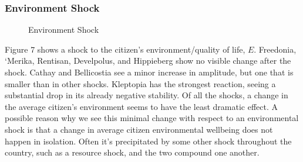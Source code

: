 \documentclass[12pt]{article}
\begin{document}
\begin{spacing}{1.5}
\subsubsection{Environment Shock}

\begin{figure}
\centering
{} 
\caption{Environment Shock}

\end{figure}


Figure 7 shows a shock to the citizen's environment/quality of life, $E$. Freedonia, `Merika, Rentisan, Develpolus, and Hippieberg show no visible change after the shock. Cathay and Bellicostia see a minor increase in amplitude, but one that is smaller than in other shocks. Kleptopia has the strongest reaction, seeing a substantial drop in its already negative stability. Of all the shocks, a change in the average citizen's environment seems to have the least dramatic effect. A possible reason why we see this minimal change with respect to an environmental shock is that a change in average citizen environmental wellbeing does not happen in isolation. Often it's precipitated by some other shock throughout the country, such as a resource shock, and the two compound one another. 


\end{spacing}
\end{document}
